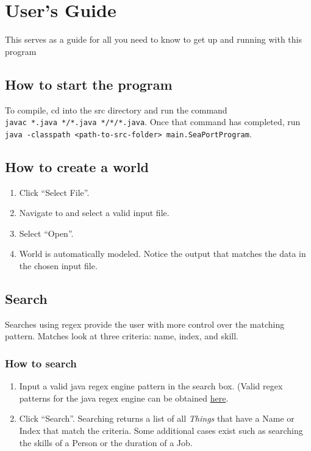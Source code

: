 \documentclass[english,floatsintext,man]{apa6}
\providecommand{\tightlist}{%
  \setlength{\itemsep}{0pt}\setlength{\parskip}{0pt}}
\begin{document}
\section{User's Guide}\label{users-guide}

This serves as a guide for all you need to know to get up and running
with this program

\subsection{How to start the program}\label{how-to-start-the-program}

To compile, cd into the src directory and run the command
\texttt{javac\ *.java\ */*.java\ */*/*.java}. Once that command has
completed, run
\texttt{java\ -classpath\ \textless{}path-to-src-folder\textgreater{}\ main.SeaPortProgram}.

\subsection{How to create a world}\label{how-to-create-a-world}

\begin{enumerate}
\def\labelenumi{\arabic{enumi}.}
\tightlist
\item
  Click \enquote{Select File}.
\item
  Navigate to and select a valid input file.
\item
  Select \enquote{Open}.
\item
  World is automatically modeled. Notice the output that matches the
  data in the chosen input file.
\end{enumerate}

\subsection{Search}\label{search}

Searches using regex provide the user with more control over the
matching pattern. Matches look at three criteria: name, index, and
skill.

\subsubsection{How to search}\label{how-to-search}

\begin{enumerate}
\def\labelenumi{\arabic{enumi}.}
\tightlist
\item
  Input a valid java regex engine pattern in the search box. (Valid
  regex patterns for the java regex engine can be obtained
  \href{http://docs.oracle.com/javase/8/docs/api/java/util/regex/Pattern.html}{here}.
\item
  Click \enquote{Search}. Searching returns a list of all \emph{Things}
  that have a Name or Index that match the criteria. Some additional
  cases exist such as searching the skills of a Person or the duration
  of a Job.
\end{enumerate}
\end{document}
